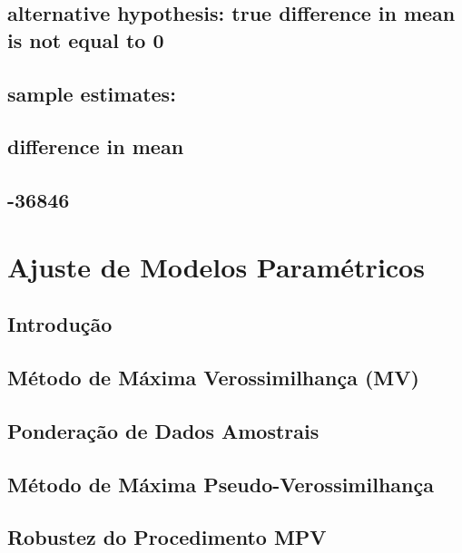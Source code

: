 \documentclass[]{book}
\theoremstyle{definition}
\theoremstyle{definition}
\theoremstyle{definition}
\theoremstyle{remark}
\begin{document}
\section{alternative hypothesis: true difference in mean is not equal to
0}\label{alternative-hypothesis-true-difference-in-mean-is-not-equal-to-0-1}

\section{sample estimates:}\label{sample-estimates-1}

\section{difference in mean}\label{difference-in-mean-1}

\section{-36846}\label{section-29}

\chapter{Ajuste de Modelos Paramétricos}\label{ajmodpar}

\section{Introdução}\label{modpar1}

\section{Método de Máxima Verossimilhança
(MV)}\label{metodo-de-maxima-verossimilhanca-mv}

\section{Ponderação de Dados
Amostrais}\label{ponderacao-de-dados-amostrais}

\section{Método de Máxima Pseudo-Verossimilhança}\label{modpar3}

\section{Robustez do Procedimento
MPV}\label{robustez-do-procedimento-mpv}
\end{document}
